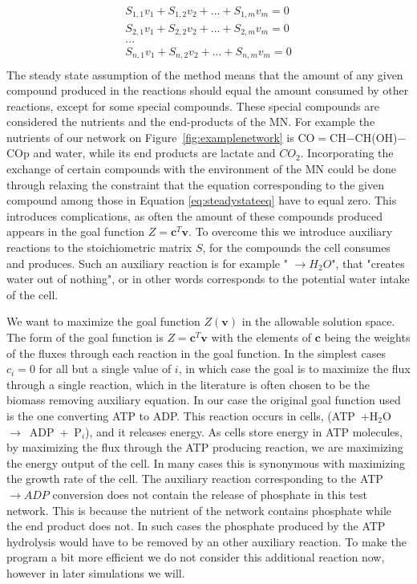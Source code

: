 \documentclass[a4paper,12pt]{article}
\begin{document}
	\begin{equation}\label{eq:steadystateeq}
		\begin{matrix}
			S_{1,1} v_1 + S_{1,2} v_2 + ... + S_{1,m} v_m=0 \\
			S_{2,1} v_1 + S_{2,2} v_2 + ... + S_{2,m} v_m=0 \\
			... \\
			S_{n,1} v_1 + S_{n,2} v_2 + ... + S_{n,m} v_m=0 \\
		\end{matrix}
	\end{equation}
	The steady state assumption of the method means that the amount of any given compound produced in the reactions should equal the amount consumed by other reactions, except for some special compounds. These special compounds are considered the nutrients and the end-products of the MN. For example the nutrients of our network on Figure~\ref {fig:examplenetwork} is CO$=$CH$-$CH(OH)$-$COp and water, while its end products are lactate and $CO_2$. Incorporating the exchange of certain compounds with the environment of the MN could be done through relaxing the constraint that the equation corresponding to the given compound among those in Equation \ref{eq:steadystateeq} have to equal zero. This introduces complications, as often the amount of these compounds produced appears in the goal function  $Z=\mathbf{c}^T \mathbf{v}$. To overcome this we introduce auxiliary reactions to the stoichiometric matrix $S$, for the compounds the cell consumes and produces. Such an auxiliary reaction is for example " $ \rightarrow H_2O$", that "creates water out of nothing", or in other words corresponds to the potential water intake of the cell.%


	We want to maximize the goal function $Z \left( \mathbf{v} \right)$ in the allowable solution space.   The form of the goal function is $Z=\mathbf{c}^T \mathbf{v}$ with the elements of $\mathbf{c}$ being the weights of the fluxes through each reaction in the goal function. In the simplest cases $c_i=0$ for all but a single value of $i$, in which case the goal is to maximize the flux through a single reaction, which in the literature is often chosen to be the biomass removing auxiliary equation\cite{whatisfluxbalance}. In our case the original goal function used is the one converting ATP to ADP. This reaction occurs in cells, (ATP~+H$_2$O~$\rightarrow$~ADP~+~P$_i$), and it releases energy. As cells store energy in ATP molecules,  by maximizing the flux through the ATP producing reaction, we are maximizing the energy output of the cell. In many cases this is synonymous with maximizing the growth rate of the cell. The auxiliary reaction corresponding to the ATP $\rightarrow ADP$ conversion does not contain the release of phosphate in this test network. This is because the nutrient of the network contains phosphate while the end product does not. In such cases the phosphate produced by the ATP hydrolysis would have to be removed by an other auxiliary reaction. To make the program a bit more efficient we do not consider this additional reaction now, however in later simulations we will. 
	
\end{document}
